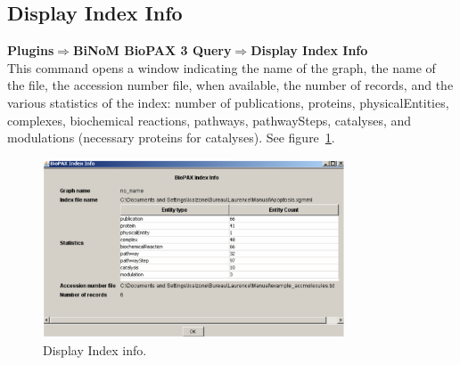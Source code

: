 \subsection{Display Index Info}
\textbf{Plugins$\Rightarrow$BiNoM BioPAX 3 Query$\Rightarrow$Display Index Info}\\
This command opens a window indicating the name of the graph, the name of the file, the accession number file, when available, the number of records, and the various statistics of the index: number of publications, proteins, physicalEntities, complexes, biochemical reactions, pathways, pathwaySteps, catalyses, and modulations (necessary proteins for catalyses). See figure~\ref{BioPAX_Index_Info}.
\begin{figure}[h]
\centering
\includegraphics[width=0.8\textwidth]{graphics/BioPAX_Index_Info}
\caption{Display Index info.}
\label{BioPAX_Index_Info}
\end{figure}

